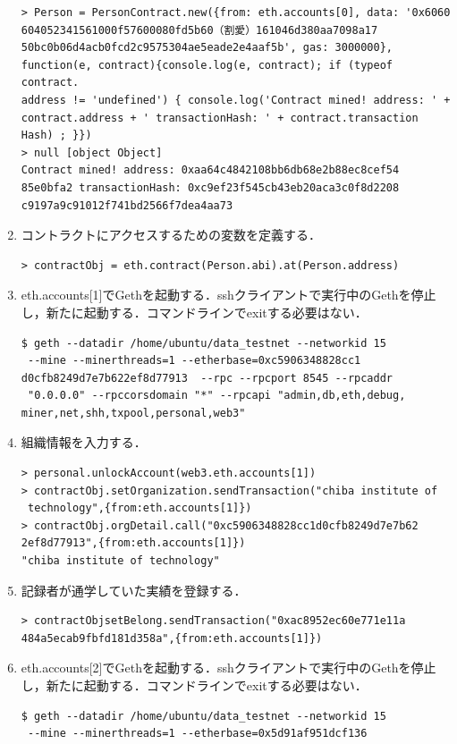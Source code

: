 \begin{enumerate}
\begin{verbatim}
> Person = PersonContract.new({from: eth.accounts[0], data: '0x6060
604052341561000f57600080fd5b60（割愛）161046d380aa7098a17
50bc0b06d4acb0fcd2c9575304ae5eade2e4aaf5b', gas: 3000000}, 
function(e, contract){console.log(e, contract); if (typeof contract.
address != 'undefined') { console.log('Contract mined! address: ' + 
contract.address + ' transactionHash: ' + contract.transaction
Hash) ; }})
> null [object Object]
Contract mined! address: 0xaa64c4842108bb6db68e2b88ec8cef54
85e0bfa2 transactionHash: 0xc9ef23f545cb43eb20aca3c0f8d2208
c9197a9c91012f741bd2566f7dea4aa73
\end{verbatim}
\item コントラクトにアクセスするための変数を定義する．
\begin{verbatim}
> contractObj = eth.contract(Person.abi).at(Person.address)
\end{verbatim}
\item eth.accounts[1]でGethを起動する．sshクライアントで実行中のGethを停止し，新たに起動する．コマンドラインでexitする必要はない．
\begin{verbatim}
$ geth --datadir /home/ubuntu/data_testnet --networkid 15
 --mine --minerthreads=1 --etherbase=0xc5906348828cc1
d0cfb8249d7e7b622ef8d77913  --rpc --rpcport 8545 --rpcaddr
 "0.0.0.0" --rpccorsdomain "*" --rpcapi "admin,db,eth,debug,
miner,net,shh,txpool,personal,web3"
\end{verbatim}
\item 組織情報を入力する．
\begin{verbatim}
> personal.unlockAccount(web3.eth.accounts[1])
> contractObj.setOrganization.sendTransaction("chiba institute of
 technology",{from:eth.accounts[1]})
> contractObj.orgDetail.call("0xc5906348828cc1d0cfb8249d7e7b62
2ef8d77913",{from:eth.accounts[1]})
"chiba institute of technology"
\end{verbatim}
\item 記録者が通学していた実績を登録する．
\begin{verbatim}
> contractObjsetBelong.sendTransaction("0xac8952ec60e771e11a
484a5ecab9fbfd181d358a",{from:eth.accounts[1]})
\end{verbatim}
\newpage
\item eth.accounts[2]でGethを起動する．sshクライアントで実行中のGethを停止し，新たに起動する．コマンドラインでexitする必要はない．
\begin{verbatim}
$ geth --datadir /home/ubuntu/data_testnet --networkid 15
 --mine --minerthreads=1 --etherbase=0x5d91af951dcf136

\end{verbatim}
\end{enumerate}
